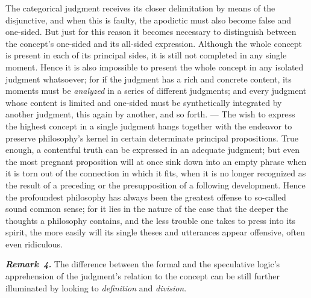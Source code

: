 \documentclass[12pt]{book}
\newcommand{\anm}[1]{\emph{\textbf{Remark~#1.}}}
\begin{document}
The categorical judgment receives its closer delimitation by means of the
disjunctive, and when this is faulty, the apodictic must also become false
and one-sided. But just for this reason it becomes necessary to distinguish
between the concept's one-sided and its all-sided expression. Although the
whole concept is present in each of its principal sides, it is still not
completed in any single moment. Hence it is also impossible to present the
whole concept in any isolated judgment whatsoever; for if the judgment has a
rich and concrete content, its moments must be \emph{analyzed} in a series
of different judgments; and every judgment whose content is limited and
one-sided must be synthetically integrated by another judgment, this again
by another, and so forth. --- The wish to express the highest concept in a
single judgment hangs together with the endeavor to preserve philosophy's
kernel in certain determinate principal propositions. True enough, a
contentful truth can be expressed in an adequate judgment; but even the most
pregnant proposition will at once sink down into an empty phrase when it is
torn out of the connection in which it fits, when it is no longer recognized
as the result of a preceding or the presupposition of a following
development. Hence the profoundest philosophy has always been the greatest
offense to so-called sound common sense; for it lies in the nature of the
case that the deeper the thoughts a philosophy contains, and the less
trouble one takes to press into its spirit, the more easily will its single
theses and utterances appear offensive, often even ridiculous.

\anm{4} The difference between the formal and the speculative logic's
apprehension of the judgment's relation to the concept can be still further
illuminated by looking to \emph{definition} and \emph{division}.
\end{document}
